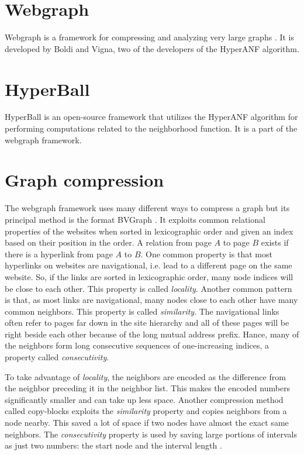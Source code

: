 \section{Webgraph}
Webgraph is a framework for compressing and analyzing very large graphs \cite{webgraph}. It is developed by Boldi and Vigna, two of the developers of the HyperANF algorithm.


\section{HyperBall}
HyperBall is an open-source framework that utilizes the HyperANF algorithm for performing computations related to the neighborhood function. It is a part of the webgraph framework.

\section{Graph compression}
\label{sec:Compression}

The webgraph framework \cite{webgraph} uses many different ways to compress a graph but its principal method is the format BVGraph \cite{webgraph-compression}. It exploits common relational properties of the websites when sorted in lexicographic order and given an index based on their position in the order. A relation from page $A$ to page $B$ exists if there is a hyperlink from page $A$ to $B$. One common property is that most hyperlinks on websites are navigational, i.e. lead to a different page on the same website. So, if the links are sorted in lexicographic order, many node indices will be close to each other. This property is called \emph{locality}. Another common pattern is that, as most links are navigational, many nodes close to each other have many common neighbors. This property is called \emph{similarity}. The navigational links often refer to pages far down in the site hierarchy and all of these pages will be right beside each other because of the long mutual address prefix. Hance, many of the neighbors form long consecutive sequences of one-increasing indices, a property called \emph{consecutivity}.

To take advantage of \emph{locality}, the neighbors are encoded as the difference from the neighbor preceding it in the neighbor list. This makes the encoded numbers significantly smaller and can take up less space. Another compression method called copy-blocks exploits the \emph{similarity} property and copies neighbors from a node nearby. This saved a lot of space if two nodes have almost the exact same neighbors. The \emph{consecutivity} property is used by saving large portions of intervals as just two numbers: the start node and the interval length \cite{webgraph-compression}. 

